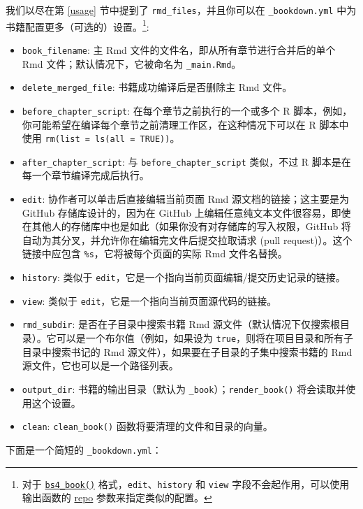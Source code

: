 \documentclass[
  12pt,
]{krantz}
\providecommand{\tightlist}{%
  \setlength{\itemsep}{0pt}\setlength{\parskip}{0pt}}
\theoremstyle{definition}
\theoremstyle{definition}
\theoremstyle{definition}
\theoremstyle{definition}
\theoremstyle{remark}
\begin{document}
我们以尽在第 \ref{usage} 节中提到了 \texttt{rmd\_files}，并且你可以在 \texttt{\_bookdown.yml} 中为书籍配置更多（可选的）设置。\footnote{对于 \protect\hyperlink{bs4-book}{\texttt{bs4\_book()}} 格式，\texttt{edit}、\texttt{history} 和 \texttt{view} 字段不会起作用，可以使用输出函数的 \protect\hyperlink{specifying-the-repository}{repo} 参数来指定类似的配置。}:

\begin{itemize}
\tightlist
\item
  \texttt{book\_filename}: 主 Rmd 文件的文件名，即从所有章节进行合并后的单个 Rmd 文件；默认情况下，它被命名为 \texttt{\_main.Rmd}。
\item
  \texttt{delete\_merged\_file}: 书籍成功编译后是否删除主 Rmd 文件。
\item
  \texttt{before\_chapter\_script}: 在每个章节之前执行的一个或多个 R 脚本，例如，你可能希望在编译每个章节之前清理工作区，在这种情况下可以在 R 脚本中使用 \texttt{rm(list\ =\ ls(all\ =\ TRUE))}。
\item
  \texttt{after\_chapter\_script}: 与 \texttt{before\_chapter\_script} 类似，不过 R 脚本是在每一个章节编译完成后执行。
\item
  \texttt{edit}: 协作者可以单击后直接编辑当前页面 Rmd 源文档的链接；这主要是为 GitHub 存储库设计的，因为在 GitHub 上编辑任意纯文本文件很容易，即使在其他人的存储库中也是如此（如果你没有对存储库的写入权限，GitHub 将自动为其分叉，并允许你在编辑完文件后提交拉取请求 (pull request)）。这个链接中应包含 \texttt{\%s}，它将被每个页面的实际 Rmd 文件名替换。
\item
  \texttt{history}: 类似于 \texttt{edit}，它是一个指向当前页面编辑/提交历史记录的链接。
\item
  \texttt{view}: 类似于 \texttt{edit}，它是一个指向当前页面源代码的链接。
\item
  \texttt{rmd\_subdir}: 是否在子目录中搜索书籍 Rmd 源文件（默认情况下仅搜索根目录）。它可以是一个布尔值（例如，如果设为 \texttt{true}，则将在项目目录和所有子目录中搜索书记的 Rmd 源文件），如果要在子目录的子集中搜索书籍的 Rmd 源文件，它也可以是一个路径列表。
\item
  \texttt{output\_dir}: 书籍的输出目录（默认为 \texttt{\_book}）；\texttt{render\_book()} 将会读取并使用这个设置。
\item
  \texttt{clean}: \texttt{clean\_book()} 函数将要清理的文件和目录的向量。
\end{itemize}

下面是一个简短的 \texttt{\_bookdown.yml}：
\end{document}
